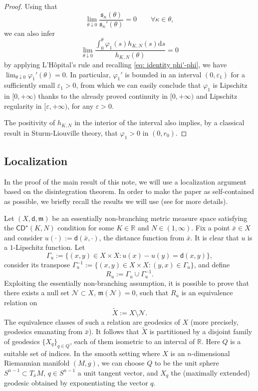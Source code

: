 \documentclass[12pt]{article}
\newcommand{\R}{\mathbb{R}}
\newcommand{\dd}{\mathrm{d}}
\newcommand{\CD}{\mathsf{CD}}
\newcommand{\mm}{\mathfrak m}
\newcommand{\sfd}{\mathsf d}
\theoremstyle{plain}
\theoremstyle{definition}
\begin{document}
\begin{proof}
Using that
\[\lim_{\theta\downarrow 0}\frac{\mathfrak{s}_{\kappa}(\theta)}{\mathfrak{s}_{\kappa}'(\theta)}=0 \qquad \forall \kappa\in\mathbb{\theta},\]
we can also infer
\[
\lim_{\theta\downarrow 0} \frac{\int_0^{\theta} \varphi_1(s)h_{K,N}(s)\dd s}{h_{K,N}(\theta)}=0
\]
by applying L'H\^{o}pital's rule and recalling \eqref{eq: identity phi'-phi}, we have $\lim_{\theta\downarrow 0}\varphi_1'(\theta)=0$. In particular, $\varphi_1'$ is bounded in an interval $(0,\varepsilon_1)$ for a sufficiently small $\varepsilon_1>0$, from which we can easily conclude that $\varphi_1$ is Lipschitz in $[0,+\infty)$ thanks to the already proved continuity in $[0,+\infty)$ and Lipschitz regularity in $[\varepsilon,+\infty)$, for any $\varepsilon>0$.

The positivity of $h_{K,N}$ in the interior of the interval also implies, by a classical result in Sturm-Liouville theory, that $\varphi_1>0$ in $(0,r_0)$.
\end{proof}

\subsection{Localization}
In the proof of the main result of this note, we will use a localization argument based on the disintegration theorem. In order to make the paper as self-contained as possible, we briefly recall the results we will use (see \cite{cavalletti-mondino-inv,cavalletti-mondino-apde} for more details).

Let $(X,\sfd,\mm)$ be an essentially non-branching metric measure space satisfying the $\CD^{\star}(K,N)$ condition for some $K\in \R$ and $N\in (1,\infty)$. Fix a point $\bar{x}\in X$ and consider $u(\cdot):=\sfd(\bar{x}, \cdot)$, the distance function from $\bar{x}$. It is clear that $u$ is a $1$-Lipschitz function. Let
\begin{equation}\label{def:Gammau}
\Gamma_u:=\{(x,y)\in X\times X \colon u(x)-u(y)=\sfd(x,y)\},
\end{equation}
consider its transpose $\Gamma_u^{-1}:=\{(x,y)\in X\times X \colon (y,x)\in \Gamma_u\}$, and define
\begin{equation}\label{def:Ru}
R_u:=\Gamma_u\cup \Gamma_u^{-1}.
\end{equation}
Exploiting the essentially non-branching assumption, it is possible to prove that there exists a null set $\mathcal{N}\subset X$, $\mm(\mathcal{N})=0$, such that $R_u$ is an equivalence relation on
$$\tilde{X}:=X\setminus \mathcal{N}.$$
 The equivalence classes of such a relation are geodesics of $X$ (more precisely, geodesics emanating from $\bar{x}$). It follows that $\tilde{X}$ is partitioned by  a disjoint family of geodesics $\{X_q\}_{q\in Q}$, each of them isometric to an interval of $\R$. Here $Q$ is a suitable set of indices. In the smooth setting where $X$ is an $n$-dimensional Riemannian manifold $(M,g)$, we can choose $Q$ to be the unit sphere $S^{n-1}\subset T_{\bar{x}} M$, $q\in S^{n-1}$ a unit tangent vector, and $X_q$ the (maximally extended) geodesic obtained by exponentiating the vector $q$.
\end{document}
